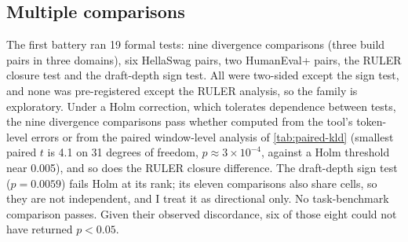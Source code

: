 \subsection{Multiple comparisons}\label{sec:multiplicity}
The first battery ran 19 formal tests: nine divergence comparisons (three build pairs in three
domains), six HellaSwag pairs, two HumanEval+ pairs, the RULER closure test and the draft-depth sign
test. All were two-sided except the sign test, and none was pre-registered except the RULER analysis,
so the family is exploratory. Under a Holm correction, which tolerates dependence between tests, the
nine divergence comparisons pass whether computed from the tool's token-level errors or from the paired
window-level analysis of \cref{tab:paired-kld} (smallest paired $t$ is 4.1 on 31 degrees of freedom,
$p\approx3\times10^{-4}$, against a Holm threshold near 0.005), and so does the RULER closure
difference. The draft-depth sign test ($p=0.0059$) fails Holm at its rank; its eleven comparisons also
share cells, so they are not independent, and I treat it as directional only. No task-benchmark
comparison passes. Given their observed discordance, six of those eight could not have returned
$p<0.05$.
